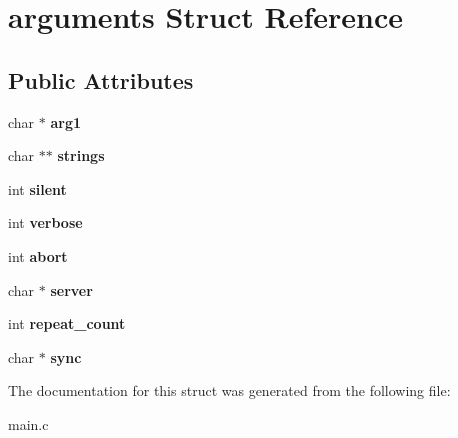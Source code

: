 \hypertarget{structarguments}{\section{arguments Struct Reference}
\label{structarguments}
}
\subsection*{Public Attributes}
\begin{DoxyCompactItemize}
\item 
\hypertarget{structarguments_a1ffe29209d2f8dca972ebdd60f1ec5ad}{char $\ast$ {\bfseries arg1}}\label{structarguments_a1ffe29209d2f8dca972ebdd60f1ec5ad}

\item 
\hypertarget{structarguments_a2f0d64c5b69ec28ab390ecefa822d9ff}{char $\ast$$\ast$ {\bfseries strings}}\label{structarguments_a2f0d64c5b69ec28ab390ecefa822d9ff}

\item 
\hypertarget{structarguments_ac4f4bdc65065e92c2cb8bde63735c5a2}{int {\bfseries silent}}\label{structarguments_ac4f4bdc65065e92c2cb8bde63735c5a2}

\item 
\hypertarget{structarguments_af26be46c71f5dceb1a990d05b926c7ec}{int {\bfseries verbose}}\label{structarguments_af26be46c71f5dceb1a990d05b926c7ec}

\item 
\hypertarget{structarguments_a8458087e6bd72b988f280ef18fbd98e9}{int {\bfseries abort}}\label{structarguments_a8458087e6bd72b988f280ef18fbd98e9}

\item 
\hypertarget{structarguments_af3ab45073045d6cedc4b292b4be59801}{char $\ast$ {\bfseries server}}\label{structarguments_af3ab45073045d6cedc4b292b4be59801}

\item 
\hypertarget{structarguments_ae41c229081083fc0fd1f909a5fa85891}{int {\bfseries repeat\-\_\-count}}\label{structarguments_ae41c229081083fc0fd1f909a5fa85891}

\item 
\hypertarget{structarguments_aafbf3951e3ad44150bacbaf9c5033767}{char $\ast$ {\bfseries sync}}\label{structarguments_aafbf3951e3ad44150bacbaf9c5033767}

\end{DoxyCompactItemize}


The documentation for this struct was generated from the following file\-:\begin{DoxyCompactItemize}
\item 
main.\-c\end{DoxyCompactItemize}
